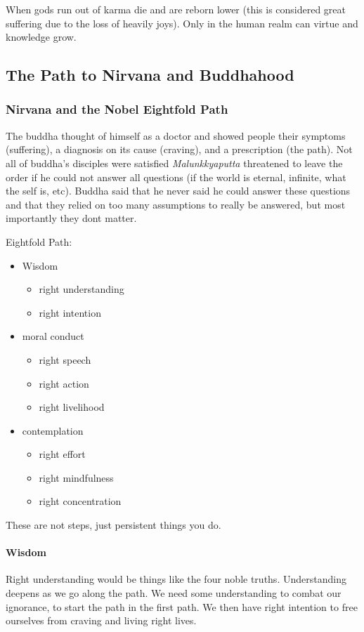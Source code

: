 \documentclass{article}
\begin{document}
When gods run out of karma die and are reborn lower (this is considered great suffering due to the loss of heavily joys). Only in the human realm can virtue and knowledge grow.

\subsection*{The Path to Nirvana and Buddhahood}
\label{sub:the_path_to_nirvana_and_buddhahood}
\subsubsection*{Nirvana and the Nobel Eightfold Path}
\label{ssub:nirvana_and_the_nobel_eightfold_path}
The buddha thought of himself as a doctor and showed people their symptoms (suffering), a diagnosis on its cause (craving), and a prescription (the path). Not all of buddha's disciples were satisfied \emph{Malunkkyaputta} threatened to leave the order if he could not answer all questions (if the world is eternal, infinite, what the self is, etc). Buddha said that he never said he could answer these questions and that they relied on too many assumptions to really be answered, but most importantly they dont matter.

Eightfold Path:
\begin{itemize}
	\item Wisdom
	\begin{itemize}
		\item right understanding
		\item right intention
	\end{itemize}
	\item moral conduct
	\begin{itemize}
		\item right speech
		\item right action
		\item right livelihood
	\end{itemize}
	\item contemplation
	\begin{itemize}
		\item right effort
		\item right mindfulness
		\item right concentration
	\end{itemize}
\end{itemize}
These are not steps, just persistent things you do.

\paragraph{Wisdom}
\label{par:wisdom}
Right understanding would be things like the four noble truths. Understanding deepens as we go along the path. We need some understanding to combat our ignorance, to start the path in the first path. We then have right intention to free ourselves from craving and living right lives.
\end{document}
